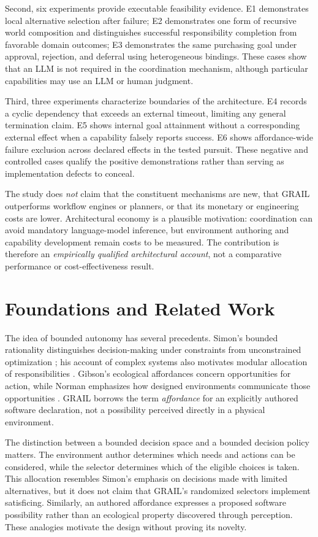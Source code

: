 \documentclass[11pt]{article}
\begin{document}
Second, six experiments provide executable feasibility evidence. E1 demonstrates local alternative selection after failure; E2 demonstrates one form of recursive world composition and distinguishes successful responsibility completion from favorable domain outcomes; E3 demonstrates the same purchasing goal under approval, rejection, and deferral using heterogeneous bindings. These cases show that an LLM is not required in the coordination mechanism, although particular capabilities may use an LLM or human judgment.

Third, three experiments characterize boundaries of the architecture. E4 records a cyclic dependency that exceeds an external timeout, limiting any general termination claim. E5 shows internal goal attainment without a corresponding external effect when a capability falsely reports success. E6 shows affordance-wide failure exclusion across declared effects in the tested pursuit. These negative and controlled cases qualify the positive demonstrations rather than serving as implementation defects to conceal.

The study does \emph{not} claim that the constituent mechanisms are new, that GRAIL outperforms workflow engines or planners, or that its monetary or engineering costs are lower. Architectural economy is a plausible motivation: coordination can avoid mandatory language-model inference, but environment authoring and capability development remain costs to be measured. The contribution is therefore an \emph{empirically qualified architectural account}, not a comparative performance or cost-effectiveness result.


\section{Foundations and Related Work}
The idea of bounded autonomy has several precedents. Simon's bounded rationality distinguishes decision-making under constraints from unconstrained optimization \cite{Simon1955}; his account of complex systems also motivates modular allocation of responsibilities \cite{Simon1962}. Gibson's ecological affordances concern opportunities for action, while Norman emphasizes how designed environments communicate those opportunities \cite{Gibson1979,Norman1988}. GRAIL borrows the term \emph{affordance} for an explicitly authored software declaration, not a possibility perceived directly in a physical environment.

The distinction between a bounded decision space and a bounded decision policy matters. The environment author determines which needs and actions can be considered, while the selector determines which of the eligible choices is taken. This allocation resembles Simon's emphasis on decisions made with limited alternatives, but it does not claim that GRAIL's randomized selectors implement satisficing. Similarly, an authored affordance expresses a proposed software possibility rather than an ecological property discovered through perception. These analogies motivate the design without proving its novelty.
\end{document}
